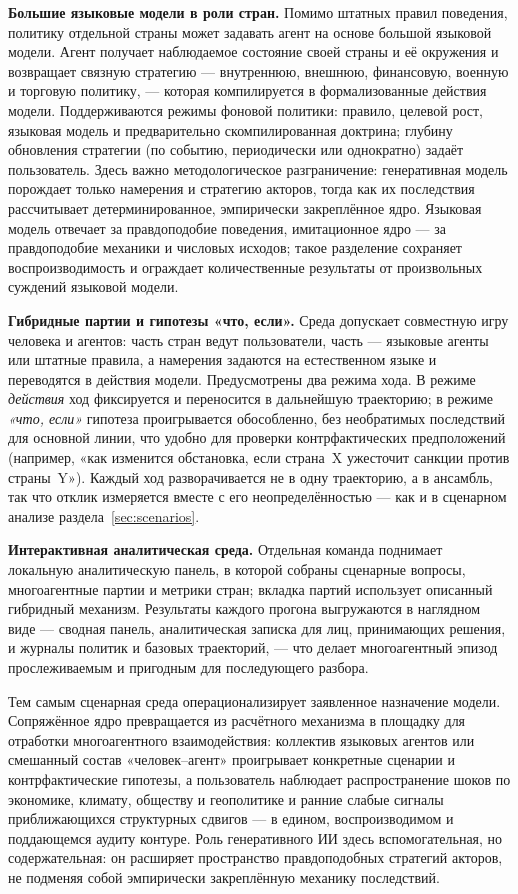 \documentclass[11pt,a4paper]{article}
\begin{document}
\textbf{Большие языковые модели в роли стран.} Помимо штатных правил поведения, политику
отдельной страны может задавать агент на основе большой языковой модели. Агент получает
наблюдаемое состояние своей страны и её окружения и возвращает связную стратегию ---
внутреннюю, внешнюю, финансовую, военную и торговую политику, --- которая компилируется в
формализованные действия модели. Поддерживаются режимы фоновой политики: правило, целевой
рост, языковая модель и предварительно скомпилированная доктрина; глубину обновления
стратегии (по событию, периодически или однократно) задаёт пользователь. Здесь важно
методологическое разграничение: генеративная модель порождает только намерения и стратегию
акторов, тогда как их последствия рассчитывает детерминированное, эмпирически закреплённое
ядро. Языковая модель отвечает за правдоподобие поведения, имитационное ядро --- за
правдоподобие механики и числовых исходов; такое разделение сохраняет воспроизводимость и
ограждает количественные результаты от произвольных суждений языковой модели.

\textbf{Гибридные партии и гипотезы «что, если».} Среда допускает совместную игру человека и
агентов: часть стран ведут пользователи, часть --- языковые агенты или штатные правила, а
намерения задаются на естественном языке и переводятся в действия модели. Предусмотрены два
режима хода. В режиме \emph{действия} ход фиксируется и переносится в дальнейшую траекторию;
в режиме \emph{«что, если»} гипотеза проигрывается обособленно, без необратимых последствий
для основной линии, что удобно для проверки контрфактических предположений (например, «как
изменится обстановка, если страна~X ужесточит санкции против страны~Y»). Каждый ход
разворачивается не в одну траекторию, а в ансамбль, так что отклик измеряется вместе с его
неопределённостью --- как и в сценарном анализе раздела~\ref{sec:scenarios}.

\textbf{Интерактивная аналитическая среда.} Отдельная команда поднимает локальную
аналитическую панель, в которой собраны сценарные вопросы, многоагентные партии и метрики
стран; вкладка партий использует описанный гибридный механизм. Результаты каждого прогона
выгружаются в наглядном виде --- сводная панель, аналитическая записка для лиц, принимающих
решения, и журналы политик и базовых траекторий, --- что делает многоагентный эпизод
прослеживаемым и пригодным для последующего разбора.

Тем самым сценарная среда операционализирует заявленное назначение модели. Сопряжённое ядро
превращается из расчётного механизма в площадку для отработки многоагентного взаимодействия:
коллектив языковых агентов или смешанный состав «человек--агент» проигрывает конкретные
сценарии и контрфактические гипотезы, а пользователь наблюдает распространение шоков по
экономике, климату, обществу и геополитике и ранние слабые сигналы приближающихся
структурных сдвигов --- в едином, воспроизводимом и поддающемся аудиту контуре. Роль
генеративного ИИ здесь вспомогательная, но содержательная: он расширяет пространство
правдоподобных стратегий акторов, не подменяя собой эмпирически закреплённую механику
последствий.
\end{document}
